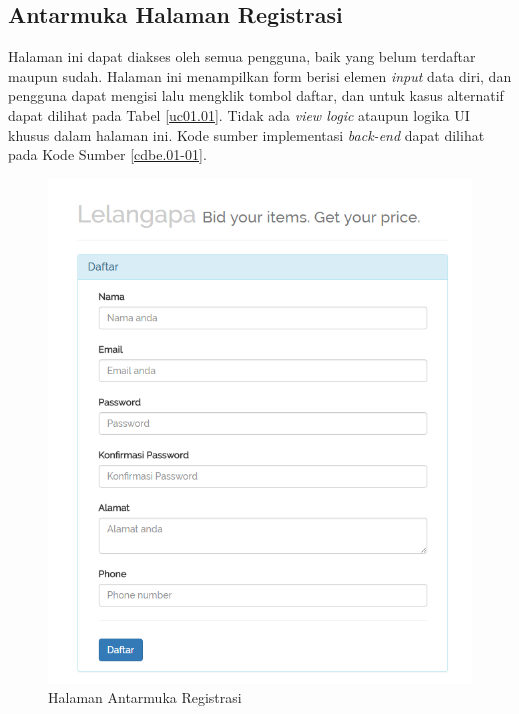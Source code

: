 \subsection{Antarmuka Halaman Registrasi}    
    Halaman ini dapat diakses oleh semua pengguna, baik yang belum terdaftar maupun sudah. Halaman ini menampilkan form berisi elemen \textit{input} data diri, dan pengguna dapat mengisi lalu mengklik tombol daftar, dan untuk kasus alternatif dapat dilihat pada Tabel \ref{uc01.01}. Tidak ada \textit{view logic} ataupun logika UI khusus dalam halaman ini. Kode sumber implementasi \textit{back-end} dapat dilihat pada Kode Sumber \ref{cdbe.01-01}.

  \begin{figure}[H]
    \centering
    \includegraphics[width=.8\textwidth]{images/bab4/ui/01-01.png}
    \caption{Halaman Antarmuka Registrasi}
    \label{ui.01-01}
  \end{figure}
  
